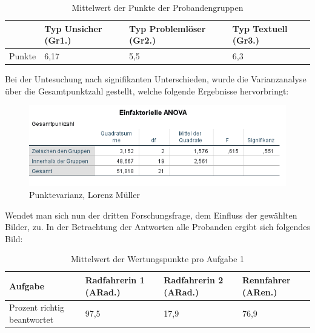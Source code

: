 \begin{table}[H]
\hspace{-5pt}
\begin{tabularx}{\textwidth + 5pt}{| @{\hspace{3pt}} M || @{\hspace{3pt}} M  | @{\hspace{3pt}} M | @{\hspace{3pt}} M |}
\hline
\textbf{ } & \textbf{Typ Unsicher (Gr1.)} & \textbf{Typ Problemlöser (Gr2.)} & \textbf{Typ Textuell (Gr3.)}\\
\hline
\hline
Punkte        & 6,17 & 5,5 & 6,3\\
\hline
\end{tabularx}
\caption{Mittelwert der Punkte der Probandengruppen}
\end{table}


Bei der Untesuchung nach signifikanten Unterschieden, wurde
die Varianzanalyse über die Gesamtpunktzahl gestellt, welche folgende Ergebnisse hervorbringt:

\begin{figure}[H]
\noindent\hspace{0.5mm}\includegraphics[width=15cm]{./Ressourcen/Punktevarianz.png}
\caption{Punktevarianz, Lorenz Müller}
\end{figure}

Wendet man sich nun der dritten Forschungsfrage, dem Einfluss der gewählten Bilder, zu. In der Betrachtung der Antworten alle Probanden ergibt sich folgendes Bild:


\begin{table}[H]
\hspace{-5pt}
\begin{tabularx}{\textwidth + 5pt}{| @{\hspace{3pt}} M || @{\hspace{3pt}} M  | @{\hspace{3pt}} M | @{\hspace{3pt}} M |}
\hline
\textbf{Aufgabe} & \textbf{Radfahrerin 1 (ARad.)} & \textbf{Radfahrerin 2 (ARad.)} & \textbf{Rennfahrer (ARen.)} \\
\hline
\hline
Prozent richtig beantwortet       & 97,5 & 17,9 & 76,9 \\
\hline
\end{tabularx}
\caption{Mittelwert der Wertungspunkte pro Aufgabe 1}
\end{table}

